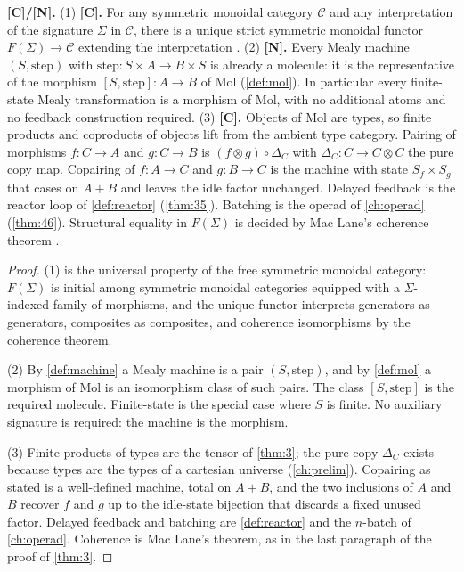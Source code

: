 \begin{theorem}\label{thm:68}\label{thm:universality}
\textbf{[C]/[N].}
(1) \textbf{[C].} For any symmetric monoidal category $\mathcal{C}$ and
any interpretation of the signature $\Sigma$ in $\mathcal{C}$, there is
a unique strict symmetric monoidal functor $F(\Sigma) \to \mathcal{C}$
extending the interpretation \citep{maclane}.
(2) \textbf{[N].} Every Mealy machine $(S, \mathrm{step})$ with
$\mathrm{step} : S \times A \to B \times S$ is already a molecule: it
is the representative of the morphism $[S, \mathrm{step}] : A \to B$ of
Mol (\autoref{def:mol}). In particular every finite-state Mealy
transformation is a morphism of Mol, with no additional atoms and no
feedback construction required.
(3) \textbf{[C].} Objects of Mol are types, so finite products and
coproducts of objects lift from the ambient type category. Pairing of
morphisms $f : C \to A$ and $g : C \to B$ is
$(f \otimes g) \circ \Delta_C$ with $\Delta_C : C \to C \otimes C$ the
pure copy map. Copairing of $f : A \to C$ and $g : B \to C$ is the
machine with state $S_f \times S_g$ that cases on $A + B$ and leaves the
idle factor unchanged. Delayed feedback is the reactor loop of
\autoref{def:reactor} (\autoref{thm:35}). Batching is the operad of
\autoref{ch:operad} (\autoref{thm:46}). Structural equality in
$F(\Sigma)$ is decided by Mac Lane's coherence theorem \citep{maclane}.
\end{theorem}

\begin{proof}
(1) is the universal property of the free symmetric monoidal category:
$F(\Sigma)$ is initial among symmetric monoidal categories equipped
with a $\Sigma$-indexed family of morphisms, and the unique functor
interprets generators as generators, composites as composites, and
coherence isomorphisms by the coherence theorem.

(2) By \autoref{def:machine} a Mealy machine is a pair
$(S, \mathrm{step})$, and by \autoref{def:mol} a morphism of Mol is an
isomorphism class of such pairs. The class $[S, \mathrm{step}]$ is the
required molecule. Finite-state is the special case where $S$ is
finite. No auxiliary signature is required: the machine is the
morphism.

(3) Finite products of types are the tensor of \autoref{thm:3}; the
pure copy $\Delta_C$ exists because types are the types of a cartesian
universe (\autoref{ch:prelim}). Copairing as stated is a well-defined
machine, total on $A + B$, and the two inclusions of $A$ and $B$
recover $f$ and $g$ up to the idle-state bijection that discards a
fixed unused factor. Delayed feedback and batching are
\autoref{def:reactor} and the $n$-batch of \autoref{ch:operad}.
Coherence is Mac Lane's theorem, as in the last paragraph of the proof
of \autoref{thm:3}.
\end{proof}

